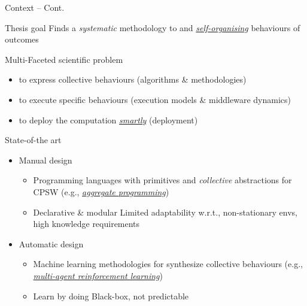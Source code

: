 \documentclass[presentation, 9pt, aspectratio=169]{beamer}\mode<presentation>{\usetheme{AMSBolognaFC}}
\newcommand{\lbl}[1]{\textbf{\textcolor{gray!90!white}{#1}}}
\begin{document}
\begin{frame}{Context -- Cont.}
  \begin{alertblock}{Thesis goal}
    Finds a \emph{systematic} methodology to  and  \emph{\underline{self-organising}} behaviours of  outcomes
  \end{alertblock}
  \begin{exampleblock}{Multi-Faceted scientific problem}
    \begin{itemize}
      \item {} to express collective behaviours (algorithms \& methodologies)
      \item {} to execute specific behaviours (execution models \& middleware dynamics)
      \item {} to deploy the computation \emph{\underline{smartly}} (deployment)      
    \end{itemize}
  \end{exampleblock}
  \begin{alertblock}{State-of-the art}
    \begin{itemize}
      \item Manual design
      \begin{itemize}
        \item Programming languages with primitives and \emph{collective} abstractions for CPSW (e.g., \emph{\underline{aggregate programming}})
        \item {\bold{\faThumbsUp}} Declarative \& modular \lbl{\faThumbsDown} Limited adaptability w.r.t., non-stationary envs, high knowledge requirements 
      \end{itemize}
      \item Automatic design
      \begin{itemize}
        \item Machine learning methodologies for synthesize collective  behaviours (e.g., \emph{\underline{multi-agent reinforcement learning}})
        \item {\bold{\faThumbsUp}} Learn by doing \lbl{\faThumbsDown} Black-box, not predictable 
      \end{itemize}
    \end{itemize}
  \end{alertblock}
\end{frame}
\end{document}
